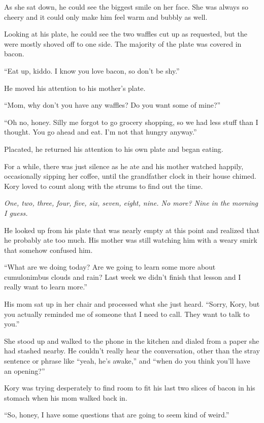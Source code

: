 \documentclass[9pt]{memoir}
\begin{document}
As she sat down, he could see the biggest smile on her face. She was always so cheery and it could only make him feel warm and bubbly as well.

Looking at his plate, he could see the two waffles cut up as requested, but the were mostly shoved off to one side. The majority of the plate was covered in bacon.

``Eat up, kiddo. I know you love bacon, so don't be shy.''

He moved his attention to his mother's plate.

``Mom, why don't you have any waffles? Do you want some of mine?''

``Oh no, honey. Silly me forgot to go grocery shopping, so we had less stuff than I thought. You go ahead and eat. I'm not that hungry anyway.''

Placated, he returned his attention to his own plate and began eating.

For a while, there was just silence as he ate and his mother watched happily, occasionally sipping her coffee, until the grandfather clock in their house chimed. Kory loved to count along with the strums to find out the time.

\textit{One, two, three, four, five, six, seven, eight, nine. No more? Nine in the morning I guess.}

He looked up from his plate that was nearly empty at this point and realized that he probably ate too much. His mother was still watching him with a weary smirk that somehow confused him.

``What are we doing today? Are we going to learn some more about cumulonimbus clouds and rain? Last week we didn't finish that lesson and I really want to learn more.''

His mom sat up in her chair and processed what she just heard. ``Sorry, Kory, but you actually reminded me of someone that I need to call. They want to talk to you.''

She stood up and walked to the phone in the kitchen and dialed from a paper she had stashed nearby. He couldn't really hear the conversation, other than the stray sentence or phrase like ``yeah, he's awake,'' and ``when do you think you'll have an opening?''

Kory was trying desperately to find room to fit his last two slices of bacon in his stomach when his mom walked back in.

``So, honey, I have some questions that are going to seem kind of weird.''
\end{document}

